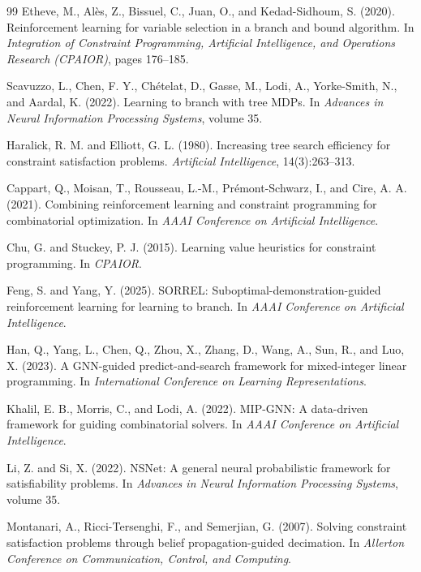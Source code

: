 \documentclass[final,5p,times,twocolumn]{elsarticle}
\begin{document}
\begin{thebibliography}{99}
Etheve, M., Al\`es, Z., Bissuel, C., Juan, O., and Kedad-Sidhoum, S. (2020).
Reinforcement learning for variable selection in a branch and bound algorithm.
In \emph{Integration of Constraint Programming, Artificial Intelligence, and Operations Research (CPAIOR)}, pages 176--185.

Scavuzzo, L., Chen, F. Y., Ch\'etelat, D., Gasse, M., Lodi, A., Yorke-Smith, N., and Aardal, K. (2022).
Learning to branch with tree MDPs.
In \emph{Advances in Neural Information Processing Systems}, volume 35.

Haralick, R. M. and Elliott, G. L. (1980).
Increasing tree search efficiency for constraint satisfaction problems.
\emph{Artificial Intelligence}, 14(3):263--313.

Cappart, Q., Moisan, T., Rousseau, L.-M., Pr\'emont-Schwarz, I., and Cire, A. A. (2021).
Combining reinforcement learning and constraint programming for combinatorial optimization.
In \emph{AAAI Conference on Artificial Intelligence}.

Chu, G. and Stuckey, P. J. (2015).
Learning value heuristics for constraint programming.
In \emph{CPAIOR}.

Feng, S. and Yang, Y. (2025).
SORREL: Suboptimal-demonstration-guided reinforcement learning for learning to branch.
In \emph{AAAI Conference on Artificial Intelligence}.

Han, Q., Yang, L., Chen, Q., Zhou, X., Zhang, D., Wang, A., Sun, R., and Luo, X. (2023).
A GNN-guided predict-and-search framework for mixed-integer linear programming.
In \emph{International Conference on Learning Representations}.

Khalil, E. B., Morris, C., and Lodi, A. (2022).
MIP-GNN: A data-driven framework for guiding combinatorial solvers.
In \emph{AAAI Conference on Artificial Intelligence}.

Li, Z. and Si, X. (2022).
NSNet: A general neural probabilistic framework for satisfiability problems.
In \emph{Advances in Neural Information Processing Systems}, volume 35.

Montanari, A., Ricci-Tersenghi, F., and Semerjian, G. (2007).
Solving constraint satisfaction problems through belief propagation-guided decimation.
In \emph{Allerton Conference on Communication, Control, and Computing}.


\end{thebibliography}
\end{document}
